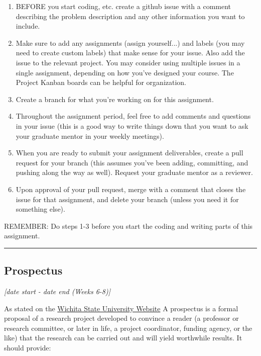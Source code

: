 \documentclass[12pt]{article}
\begin{document}
\begin{enumerate}
	\item BEFORE you start coding, etc. create a github issue with a comment describing the problem description and any other information you want to include.
	\item Make sure to add any assignments (assign yourself...) and labels (you may need to create custom labels) that make sense for your issue. Also add the issue to the relevant project.  You may consider using multiple issues in a single assignment, depending on how you've designed your course.  The Project Kanban boards can be helpful for organization.
	\item Create a branch for what you're working on for this assignment.
	\item Throughout the assignment period, feel free to add comments and questions in your issue (this is a good way to write things down that you want to ask your graduate mentor in your weekly meetings).
	\item When you are ready to submit your assignment deliverables, create a pull request for your branch (this assumes you've been adding, committing, and pushing along the way as well). Request your graduate mentor as a reviewer.
	\item Upon approval of your pull request, merge with a comment that closes the issue for that assignment, and delete your branch (unless you need it for something else).
\end{enumerate}

\noindent REMEMBER: Do steps 1-3 before you start the coding and writing parts of this assignment.






\vspace{1em}\hrule\vspace{1em}
\subsection{Prospectus}
\label{ssec:prospectus}
\textit{[date start - date end (Weeks 6-8)]}

\bigskip

As stated on the \href{https://www.wichita.edu/academics/fairmount_college_of_liberal_arts_and_sciences/english/deptenglish/WritingaResearchProspectus.php#:~:text=A%20prospectus%20is%20a%20formal,and%20will%20yield%20worthwhile%20results.}{Wichita State University Website}
A prospectus is a formal proposal of a research project developed to convince a reader (a professor or research committee, or later in life, a project coordinator, funding agency, or the like) that the research can be carried out and will yield worthwhile results. It should provide:
\end{document}
